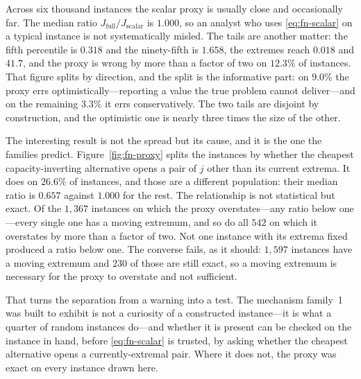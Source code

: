 Across six thousand instances the scalar proxy is usually close and occasionally far. The
median ratio $J_{\mathrm{full}}/J_{\mathrm{scalar}}$ is $1.000$, so an analyst who uses
\eqref{eq:fn-scalar} on a typical instance is not systematically misled. The tails are another
matter: the fifth percentile is $0.318$ and the ninety-fifth is $1.658$, the extremes reach
$0.018$ and $41.7$, and the proxy is wrong by more than a factor of two on $12.3\%$ of
instances. That figure splits by direction, and the split is the informative part: on
$9.0\%$ the proxy errs optimistically---reporting a value the true problem cannot
deliver---and on the remaining $3.3\%$ it errs conservatively. The two tails are disjoint by
construction, and the optimistic one is nearly three times the size of the other. \NUM{}

The interesting result is not the spread but its cause, and it is the one the families
predict. Figure~\ref{fig:fn-proxy} splits the instances by whether the cheapest
capacity-inverting alternative opens a pair of $j$ other than its current extrema. It does on
$26.6\%$ of instances, and those are a different population: their median ratio is $0.657$
against $1.000$ for the rest. The relationship is not statistical but exact. Of the $1{,}367$
instances on which the proxy overstates---any ratio below one---every single one has a moving
extremum, and so do all $542$ on which it overstates by more than a factor of two. Not one
instance with its extrema fixed produced a ratio below one. The converse fails, as it should:
$1{,}597$ instances have a moving extremum and $230$ of those are still exact, so a moving
extremum is necessary for the proxy to overstate and not sufficient. \NUM{}

That turns the separation from a warning into a test. The mechanism family~1 was built to
exhibit is not a curiosity of a constructed instance---it is what a quarter of random
instances do---and whether it is present can be checked on the instance in hand, before
\eqref{eq:fn-scalar} is trusted, by asking whether the cheapest alternative opens a
currently-extremal pair. Where it does not, the proxy was exact on every instance drawn here.

